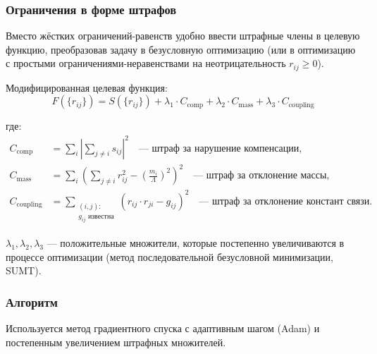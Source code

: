 \documentclass[12pt,a4paper]{article}
\begin{document}
\subsubsection{Ограничения в форме штрафов}
Вместо жёстких ограничений-равенств удобно ввести штрафные члены в целевую функцию, преобразовав задачу в безусловную оптимизацию (или в оптимизацию с простыми ограничениями-неравенствами на неотрицательность $r_{ij} \geq 0$).

Модифицированная целевая функция:
\begin{equation}
    F(\{r_{ij}\}) = S(\{r_{ij}\}) + \lambda_1 \cdot C_{\text{comp}} + \lambda_2 \cdot C_{\text{mass}} + \lambda_3 \cdot C_{\text{coupling}}
\end{equation}

где:
\begin{align}
    C_{\text{comp}} &= \sum_i \left| \sum_{j \neq i} s_{ij} \right|^2 \quad \text{--- штраф за нарушение компенсации,} \\
    C_{\text{mass}} &= \sum_i \left( \sum_{j \neq i} r_{ij}^2 - \left( \frac{m_i}{\Lambda} \right)^2 \right)^2 \quad \text{--- штраф за отклонение массы,} \\
    C_{\text{coupling}} &= \sum_{\substack{(i,j): \\ g_{ij} \text{ известна}}} \left( r_{ij} \cdot r_{ji} - g_{ij} \right)^2 \quad \text{--- штраф за отклонение констант связи.}
\end{align}

$\lambda_1, \lambda_2, \lambda_3$ --- положительные множители, которые постепенно увеличиваются в процессе оптимизации (метод последовательной безусловной минимизации, SUMT).

\subsubsection{Алгоритм}
Используется метод градиентного спуска с адаптивным шагом (Adam) и постепенным увеличением штрафных множителей.
\end{document}
